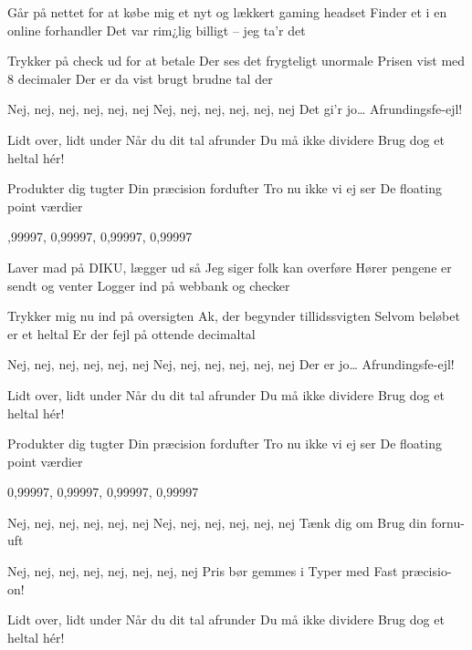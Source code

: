 \documentclass[pdftex,12pt]{article}
\begin{document}
\begin{songs}{}
\beginverse
        Går på nettet for at købe mig et
        nyt og lækkert gaming headset
        Finder et i en online forhandler
        Det var rim¿lig billigt -- jeg ta'r det

\endverse
\beginverse
        Trykker på check ud for at betale
        Der ses det frygteligt unormale
        Prisen vist med 8 decimaler
        Der er da vist brugt brudne tal der


\endverse
\beginverse
        Nej, nej, nej, nej, nej, nej
        Nej, nej, nej, nej, nej, nej
        Det gi'r jo\ldots
        Afrundingsfe-ejl!


\endverse
\beginverse
        Lidt over, lidt under
        Når du dit tal afrunder
        Du må ikke dividere
        Brug dog et heltal hér!

\endverse
\beginverse
        Produkter dig tugter
        Din præcision fordufter
        Tro nu ikke vi ej ser
        De floating point værdier


\endverse
{},99997, 0,99997, 0,99997, 0,99997


\endverse
\beginverse
        Laver mad på DIKU, lægger ud så
        Jeg siger folk kan overføre
        Hører pengene er sendt og venter
        Logger ind på webbank og checker

\endverse
\beginverse
        Trykker mig nu ind på oversigten
        Ak, der begynder tillidssvigten
        Selvom beløbet er et heltal
        Er der fejl på ottende decimaltal


\endverse
\beginverse
        Nej, nej, nej, nej, nej, nej
        Nej, nej, nej, nej, nej, nej
        Der er jo\ldots
        Afrundingsfe-ejl!


\endverse
\beginverse
        Lidt over, lidt under
        Når du dit tal afrunder
        Du må ikke dividere
        Brug dog et heltal hér!

\endverse
\beginverse
        Produkter dig tugter
        Din præcision fordufter
        Tro nu ikke vi ej ser
        De floating point værdier


        0,99997, 0,99997, 0,99997, 0,99997


\endverse
\beginverse
        Nej, nej, nej, nej, nej, nej
        Nej, nej, nej, nej, nej, nej
        Tænk dig om
        Brug din fornu-uft

\endverse
\beginverse
        Nej, nej, nej, nej, nej, nej, nej, nej
        Pris bør gemmes i
        Typer med
        Fast præcisio-on!


\endverse
\beginverse
        Lidt over, lidt under
        Når du dit tal afrunder
        Du må ikke dividere
        Brug dog et heltal hér!


\end{songs}
\end{document}
